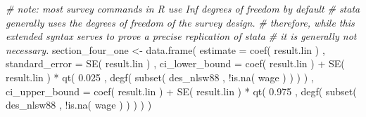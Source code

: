\documentclass[
]{book}
\newenvironment{Shaded}{\begin{snugshade}}{\end{snugshade}}
\newcommand{\AttributeTok}[1]{\textcolor[rgb]{0.77,0.63,0.00}{#1}}
\newcommand{\CommentTok}[1]{\textcolor[rgb]{0.56,0.35,0.01}{\textit{#1}}}
\newcommand{\FloatTok}[1]{\textcolor[rgb]{0.00,0.00,0.81}{#1}}
\newcommand{\FunctionTok}[1]{\textcolor[rgb]{0.00,0.00,0.00}{#1}}
\newcommand{\NormalTok}[1]{#1}
\newcommand{\OtherTok}[1]{\textcolor[rgb]{0.56,0.35,0.01}{#1}}
\newcommand{\SpecialCharTok}[1]{\textcolor[rgb]{0.00,0.00,0.00}{#1}}
\begin{document}
\begin{Shaded}
\begin{Highlighting}[]
\CommentTok{\# note: most survey commands in R use Inf degrees of freedom by default}
\CommentTok{\# stata generally uses the degrees of freedom of the survey design.}
\CommentTok{\# therefore, while this extended syntax serves to prove a precise replication of stata}
\CommentTok{\# it is generally not necessary.}
\NormalTok{section\_four\_one }\OtherTok{\textless{}{-}}
    \FunctionTok{data.frame}\NormalTok{( }
        \AttributeTok{estimate =} \FunctionTok{coef}\NormalTok{( result.lin ) , }
        \AttributeTok{standard\_error =} \FunctionTok{SE}\NormalTok{( result.lin ) , }
        \AttributeTok{ci\_lower\_bound =} 
            \FunctionTok{coef}\NormalTok{( result.lin ) }\SpecialCharTok{+} 
            \FunctionTok{SE}\NormalTok{( result.lin ) }\SpecialCharTok{*} 
            \FunctionTok{qt}\NormalTok{( }\FloatTok{0.025}\NormalTok{ , }\FunctionTok{degf}\NormalTok{( }\FunctionTok{subset}\NormalTok{( des\_nlsw88 , }\SpecialCharTok{!}\FunctionTok{is.na}\NormalTok{( wage ) ) ) ) ,}
        \AttributeTok{ci\_upper\_bound =} 
            \FunctionTok{coef}\NormalTok{( result.lin ) }\SpecialCharTok{+} 
            \FunctionTok{SE}\NormalTok{( result.lin ) }\SpecialCharTok{*} 
            \FunctionTok{qt}\NormalTok{( }\FloatTok{0.975}\NormalTok{ , }\FunctionTok{degf}\NormalTok{( }\FunctionTok{subset}\NormalTok{( des\_nlsw88 , }\SpecialCharTok{!}\FunctionTok{is.na}\NormalTok{( wage ) ) ) )}
\NormalTok{    )}
\end{Highlighting}
\end{Shaded}
\end{document}
